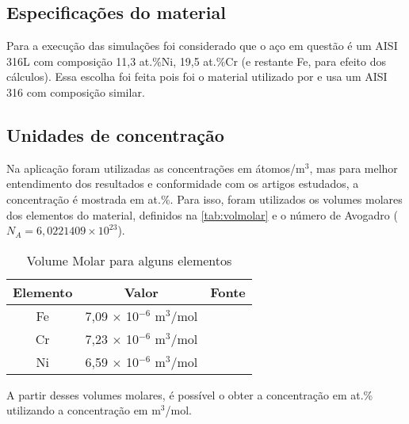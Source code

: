 \FloatBarrier
\subsection{Especificações do material}
Para a execução das simulações foi considerado que o aço em questão é um AISI 316L com composição 11,3 at.\%Ni, 19,5 at.\%Cr (e restante Fe, para efeito dos cálculos). Essa escolha foi feita pois foi o material utilizado por \cite{moskalioviene2011modeling} e \cite{christiansen2008nitrogen} usa um AISI 316 com composição similar.
\FloatBarrier

\subsection{Unidades de concentração}
Na aplicação foram utilizadas as concentrações em átomos/m$^3$, mas para melhor entendimento dos resultados e conformidade com os artigos estudados, a concentração é mostrada em at.\%.
Para isso, foram utilizados os volumes molares dos elementos do material, definidos na \autoref{tab:volmolar} e o número de Avogadro ($N_A = 6,0221409 \times 10^{23}$).

\begin{table}[ht]
\centering
\setlength{\doublerulesep}{\arrayrulewidth}
{\def\arraystretch{2}\tabcolsep=10pt
\caption{Volume Molar para alguns elementos}
\begin{tabular}{c c c}
\hline\hline
Elemento & Valor & Fonte\\\hline
Fe & 7,09 $\times$ 10$^{-6}$ m$^3$/mol  & \cite{singman1984atomic}\\
Cr & 7,23 $\times$ 10$^{-6}$ m$^3$/mol  & \cite{singman1984atomic}\\
Ni & 6,59 $\times$ 10$^{-6}$ m$^3$/mol  & \cite{singman1984atomic}\\
\hline\hline
\end{tabular}
\label{tab:volmolar}
}
\end{table}

A partir desses volumes molares, é possível o obter a concentração em at.\% utilizando a concentração em m$^3$/mol.

\begin{table}[!ht]
\centering
\setlength{\doublerulesep}{\arrayrulewidth}
{\def\arraystretch{2}\tabcolsep=10pt
\caption{Transformação de Unidade para concentração}
}
\end{table}

